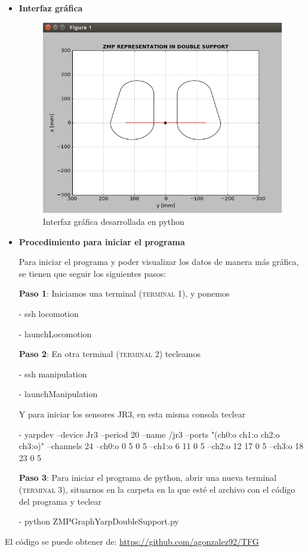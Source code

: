 \begin{itemize}

\item \textbf{Interfaz gráfica}

\begin{figure}[H]
\centering
\includegraphics[scale=0.5]{apendices/interfaz_python}
\caption{Interfaz gráfica desarrollada en python}
\label{figura_interfaz_grafica}
\end{figure}

\item \textbf{Procedimiento para iniciar el programa}

Para iniciar el programa y poder visualizar los datos de manera más gráfica, se tienen que seguir los siguientes pasos:

\textbf{Paso 1}: Iniciamos una terminal (\textsc{terminal 1}), y ponemos

- ssh locomotion

- launchLocomotion 

\textbf{Paso 2}: En otra terminal (\textsc{terminal 2}) tecleamos

- ssh manipulation

- launchManipulation

Y para iniciar los sensores JR3, en esta misma consola teclear

- yarpdev --device Jr3 --period 20 --name /jr3 --ports "(ch0:o ch1:o ch2:o ch3:o)" --channels 24 --ch0:o 0 5 0 5 --ch1:o 6 11 0 5 --ch2:o 12 17 0 5 --ch3:o 18 23 0 5

\textbf{Paso 3}: Para iniciar el programa de python, abrir una nueva terminal (\textsc{terminal 3}), situarnos en la carpeta en la que esté el archivo con el código del programa y teclear

- python ZMPGraphYarpDoubleSupport.py

\end{itemize}

El código se puede obtener de: \url{https://github.com/agonzalez92/TFG}